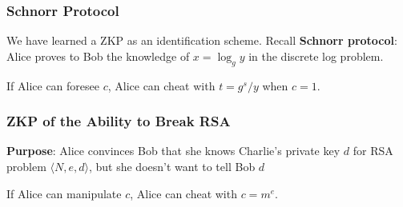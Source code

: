 \begin{frame}\frametitle{Schnorr Protocol}
We have learned a ZKP as an identification scheme. Recall \textbf{Schnorr protocol}: Alice proves to Bob the knowledge of $x=\log_gy$ in the discrete log problem.
\begin{figure}
\begin{center}

\end{center}
\end{figure}
If Alice can foresee $c$, Alice can cheat with $t=g^s/y$ when $c=1$.
\end{frame}
\begin{frame}\frametitle{ZKP of the Ability to Break RSA}
\textbf{Purpose}: Alice convinces Bob that she knows Charlie's private key $d$ for RSA problem $\langle N,e,d \rangle$, but she doesn't want to tell Bob $d$
\begin{figure}
\begin{center}

\end{center}
\end{figure}
If Alice can manipulate $c$, Alice can cheat with $c = m^e$.
\end{frame}
